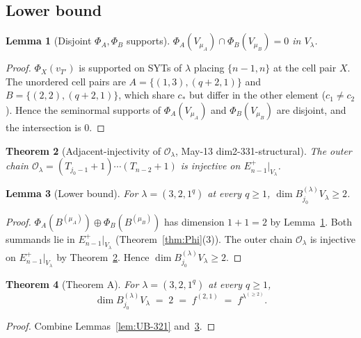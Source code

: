 \documentclass[11pt]{article}
\newtheorem{theorem}{Theorem}
\newtheorem{lemma}[theorem]{Lemma}
\theoremstyle{definition}
\begin{document}
\subsection{Lower bound}

\begin{lemma}[Disjoint $\Phi_A, \Phi_B$ supports]\label{lem:disjoint-321}
$\Phi_A(V_{\mu_A}) \cap \Phi_B(V_{\mu_B}) = 0$ in $V_\lambda$.
\end{lemma}

\begin{proof}
$\Phi_X(v_{T'})$ is supported on SYTs of $\lambda$ placing
$\{n-1, n\}$ at the cell pair $X$. The unordered cell pairs are
$A = \{(1, 3), (q + 2, 1)\}$ and $B = \{(2, 2), (q + 2, 1)\}$, which
share $c_*$ but differ in the other element ($c_1 \ne c_2$). Hence the
seminormal supports of $\Phi_A(V_{\mu_A})$ and $\Phi_B(V_{\mu_B})$ are
disjoint, and the intersection is $0$.
\end{proof}

\begin{theorem}[Adjacent-injectivity of $\mathcal{O}_\lambda$,
May-13 dim2-331-structural]\label{thm:adj-inj-321}
The outer chain $\mathcal{O}_\lambda =
(T_{j_0-1}{+}1)\cdots(T_{n-2}{+}1)$ is injective on
$E_{n-1}^+|_{V_\lambda}$.
\end{theorem}

\begin{lemma}[Lower bound]\label{lem:LB-321}
For $\lambda = (3, 2, 1^q)$ at every $q \ge 1$,
$\dim B^{(\lambda)}_{j_0} V_\lambda \ge 2$.
\end{lemma}

\begin{proof}
$\Phi_A(B^{(\mu_A)}) \oplus \Phi_B(B^{(\mu_B)})$ has dimension $1 + 1 = 2$
by Lemma~\ref{lem:disjoint-321}. Both summands lie in
$E_{n-1}^+|_{V_\lambda}$ (Theorem~\ref{thm:Phi}(3)). The outer chain
$\mathcal{O}_\lambda$ is injective on $E_{n-1}^+|_{V_\lambda}$ by
Theorem~\ref{thm:adj-inj-321}. Hence
$\dim B^{(\lambda)}_{j_0} V_\lambda \ge 2$.
\end{proof}

\begin{theorem}[Theorem A]\label{thm:321}
For $\lambda = (3, 2, 1^q)$ at every $q \ge 1$,
\[
   \dim B^{(\lambda)}_{j_0} V_\lambda \;=\; 2 \;=\; f^{(2, 1)}
   \;=\; f^{\lambda^{(\ge 2)}}.
\]
\end{theorem}

\begin{proof}
Combine Lemmas~\ref{lem:UB-321} and~\ref{lem:LB-321}.
\end{proof}
\end{document}
